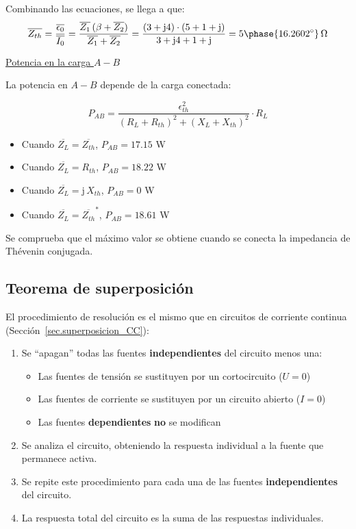 \begin{example}
Combinando las ecuaciones, se llega a que:
\begin{equation*}
  \overline{Z_{th}} = \dfrac{\overline{\epsilon_0}}{\overline{I_0}} = \dfrac{\overline{Z_1}\,(\beta + \overline{Z_2})}{\overline{Z_1}+\overline{Z_2}}=\dfrac{(3+\mathrm{j}4)\cdot (5+1+\mathrm{j})}{3+\mathrm{j}4+1+\mathrm{j}} = 5\phase{16.2602^\circ}\,\Omega
\end{equation*}

\underline{Potencia en la carga $A-B$}

La potencia en $A-B$ depende de la carga conectada:

\begin{equation*}
  P_{AB} = \dfrac{\epsilon_{th}^2}{{(R_L+R_{th})^2+(X_L+X_{th})^2}} \cdot R_L
\end{equation*}

\begin{itemize}
\item Cuando $\overline{Z_L} = \overline{Z_{th}}$, $P_{AB} = {17.15}$ W
\item Cuando $\overline{Z_L} = R_{th}$, $P_{AB} = {18.22}$ W
\item Cuando $\overline{Z_L} = \mathrm{j}\,X_{th}$, $P_{AB} = {0}$ W
\item Cuando $\overline{Z_L} = \overline{Z_{th}}^*$, $P_{AB} = {18.61}$ W
\end{itemize}

Se comprueba que el máximo valor se obtiene cuando se conecta la impedancia de Thévenin conjugada.

    \end{example}
	
	\subsection{Teorema de superposición}
	
	El procedimiento de resolución es el mismo que en circuitos de corriente continua (Sección~\ref{sec.superposicion_CC}):
	\begin{enumerate}
\item Se ``apagan'' todas las fuentes \textbf{independientes} del circuito menos una:
    \begin{itemize}
    \item Las fuentes de tensión se sustituyen por un cortocircuito ($U = 0$)
    \item Las fuentes de corriente se sustituyen por un circuito abierto ($I = 0$)
    \item Las fuentes \textbf{dependientes} \textbf{no} se modifican
    \end{itemize}
\item Se analiza el circuito, obteniendo la respuesta individual a la fuente que permanece activa.
\item Se repite este procedimiento para cada una de las fuentes \textbf{independientes} del circuito.
\item La respuesta total del circuito es la suma de las respuestas individuales.
\end{enumerate}
	
